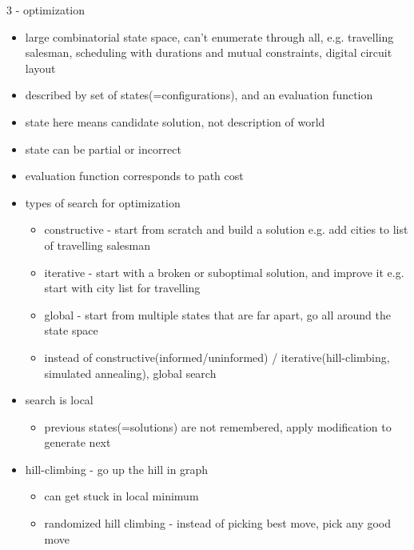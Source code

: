 \documentclass[11pt]{article}
\begin{document}
\begin{description}
\begin{itemize}
\end{itemize}

\item 3 - optimization
\begin{itemize}
	\item large combinatorial state space, can't enumerate through all, e.g. travelling salesman, scheduling with durations and mutual constraints, digital circuit layout
	\item described by set of states(=configurations), and an evaluation function
	\item state here means candidate solution, not description of world
	\item state can be partial or incorrect
	\item evaluation function corresponds to path cost
	\item types of search for optimization
	\begin{itemize}
		\item constructive - start from scratch and build a solution e.g. add cities to list of travelling salesman
		\item iterative - start with a broken or suboptimal solution, and improve it e.g. start with city list for travelling
		\item global - start from multiple states that are far apart, go all around the state space 
		\item instead of constructive(informed/uninformed) / iterative(hill-climbing, simulated annealing), global search
\end{itemize}
	
	\item search is local
	\begin{itemize}
		\item previous states(=solutions) are not remembered, apply modification to generate next
	\end{itemize}
	
	\item hill-climbing - go up the hill in graph
	\begin{itemize}
		\item can get stuck in local minimum
		\item randomized hill climbing - instead of picking best move, pick any good move
	\end{itemize}
	

\end{itemize}
\end{description}
\end{document}
